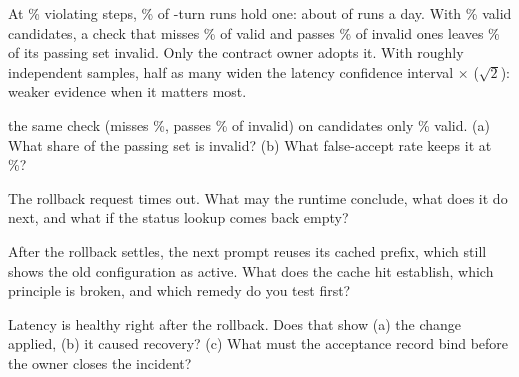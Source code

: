 \documentclass{studysheet}
\begin{document}
\begin{rightcol}
%
  {At \% violating steps, \% of -turn runs hold one: about
    of  runs a day.}{}
%
  {With \% valid candidates, a check that misses \% of valid and passes \% of
   invalid ones leaves \% of its passing set invalid.}{}
%
  {Only the contract owner adopts it. With roughly independent samples, half as many widen the latency confidence interval
   $\times$ ($\sqrt{2}$): weaker evidence when it matters most.}{}

\vspace{2pt}
\begin{qs}
\item \assumed{} the same check (misses \%, passes \% of invalid) on candidates only
  \% valid. (a) What share of the passing set is invalid? (b) What false-accept rate keeps it at
  \%?
\item The rollback request times out. What may the runtime conclude, what does it do next, and what if the status
  lookup comes back empty?
\item After the rollback settles, the next prompt reuses its cached prefix, which still shows the old
  configuration as active. What does the cache hit establish, which principle is broken, and which remedy
  do you test first?
\item Latency is healthy right after the rollback. Does that show (a) the change applied, (b) it caused recovery?
  (c) What must the acceptance record bind before the owner closes the incident?
\end{qs}
\end{rightcol}
\end{document}
